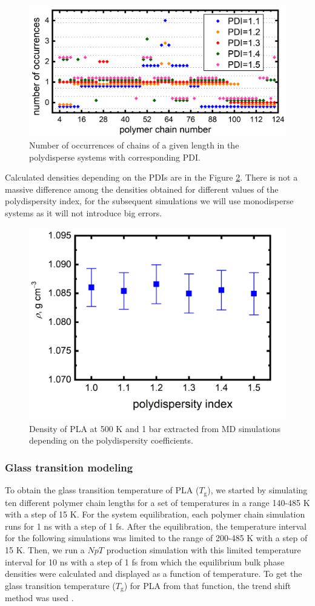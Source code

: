 \begin{figure}[htb]
	\centering
	\includegraphics[width=1\hsize]{img/polydispersity_occurrences.png}
	\caption{Number of occurrences of chains of a given length in the polydisperse systems with corresponding PDI.}
	\label{fig:polydisperzita_vyskyt}
\end{figure}       

Calculated densities depending on the PDIs are in the Figure \ref{fig:polydisperzita}. There is not a massive difference among the densities obtained for different values of the polydispersity index, for the subsequent simulations we will use monodisperse systems as it will not introduce big errors. 

\begin{figure}[htb]
	\centering
	\includegraphics[width=0.5\hsize]{img/polydisperzita.png}
	\caption{Density of PLA at 500 K and 1 bar extracted from MD simulations depending on the polydispersity coefficients.}
	\label{fig:polydisperzita}
\end{figure}       

\subsubsection{Glass transition modeling}
To obtain the glass transition temperature of PLA ($T_\mathrm{g}$), we started by simulating ten different polymer chain lengths for a set of temperatures in a range 140-485 K with a step of 15 K. For the system equilibration, each polymer chain simulation runs for 1 ns with a step of 1 fs. After the equilibration, the temperature interval for the following simulations was limited to the range of 200-485 K with a step of 15 K. Then, we run a $NpT$ production simulation with this limited temperature interval for 10 ns with a step of 1 fs from which the equilibrium bulk phase densities were calculated and displayed as a function of temperature. To get the glass transition temperature ($T_\mathrm{g}$) for PLA from that function, the trend shift method was used \cite{klajmon_does_2022}. 

